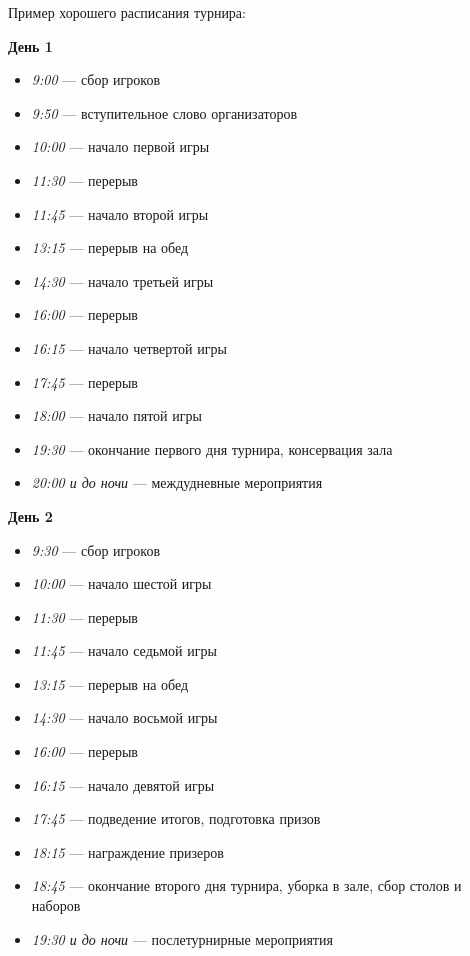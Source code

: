 Пример хорошего расписания турнира:

\textbf{День 1}

\begin{itemize}
	\item \textit{9:00} --- сбор игроков
	\item \textit{9:50} --- вступительное слово организаторов
	\item \textit{10:00} --- начало первой игры
	\item \textit{11:30} --- перерыв
	\item \textit{11:45} --- начало второй игры
	\item \textit{13:15} --- перерыв на обед
	\item \textit{14:30} --- начало третьей игры
	\item \textit{16:00} --- перерыв
	\item \textit{16:15} --- начало четвертой игры
	\item \textit{17:45} --- перерыв
	\item \textit{18:00} --- начало пятой игры
	\item \textit{19:30} --- окончание первого дня турнира, консервация зала
	\item \textit{20:00 и до ночи} --- междудневные мероприятия
\end{itemize}

\textbf{День 2}

\begin{itemize}
	\item \textit{9:30} --- сбор игроков
	\item \textit{10:00} --- начало шестой игры
	\item \textit{11:30} --- перерыв
	\item \textit{11:45} --- начало седьмой игры
	\item \textit{13:15} --- перерыв на обед
	\item \textit{14:30} --- начало восьмой игры
	\item \textit{16:00} --- перерыв
	\item \textit{16:15} --- начало девятой игры
	\item \textit{17:45} --- подведение итогов, подготовка призов
	\item \textit{18:15} --- награждение призеров
	\item \textit{18:45} --- окончание второго дня турнира, уборка в зале, сбор столов и наборов
	\item \textit{19:30 и до ночи} --- послетурнирные мероприятия
\end{itemize}

